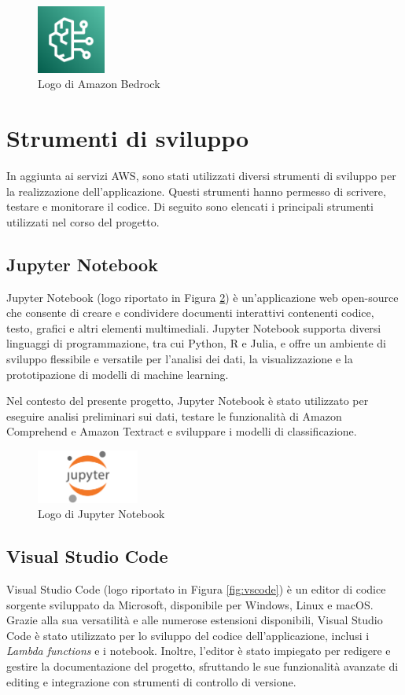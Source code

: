 \begin{figure}[h]
  \centering
  \includegraphics[width=0.2\textwidth]{img/tecnologie/bedrock.png}
  \caption{Logo di Amazon Bedrock}
  \label{fig:bedrock}
\end{figure}

\section{Strumenti di sviluppo}
In aggiunta ai servizi AWS, sono stati utilizzati diversi strumenti di sviluppo per la realizzazione dell'applicazione. Questi strumenti hanno permesso di scrivere, testare e monitorare il codice. Di seguito sono elencati i principali strumenti utilizzati nel corso del progetto.
\subsection{Jupyter Notebook}
Jupyter Notebook (logo riportato in Figura \ref{fig:jupyter}) è un'applicazione web open-source che consente di creare e condividere documenti interattivi contenenti codice, testo, grafici e altri elementi multimediali. Jupyter Notebook supporta diversi linguaggi di programmazione, tra cui Python, R e Julia, e offre un ambiente di sviluppo flessibile e versatile per l'analisi dei dati, la visualizzazione e la prototipazione di modelli di machine learning.

Nel contesto del presente progetto, Jupyter Notebook è stato utilizzato per eseguire analisi preliminari sui dati, testare le funzionalità di Amazon Comprehend e Amazon Textract e sviluppare i modelli di classificazione.

\begin{figure}[h]
  \centering
  \includegraphics[width=0.3\textwidth]{img/tecnologie/jupyter.png}
  \caption{Logo di Jupyter Notebook}
  \label{fig:jupyter}
\end{figure}
\subsection{Visual Studio Code}
Visual Studio Code (logo riportato in Figura \ref{fig:vscode}) è un editor di codice sorgente sviluppato da Microsoft, disponibile per Windows, Linux e macOS. Grazie alla sua versatilità e alle numerose estensioni disponibili, Visual Studio Code è stato utilizzato per lo sviluppo del codice dell'applicazione, inclusi i \textit{Lambda functions} e i notebook. Inoltre, l'editor è stato impiegato per redigere e gestire la documentazione del progetto, sfruttando le sue funzionalità avanzate di editing e integrazione con strumenti di controllo di versione.


